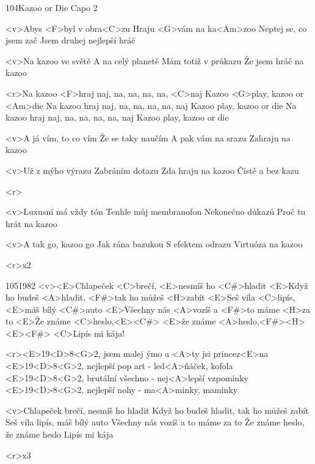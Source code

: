 \begin{song}{104}{Kazoo or Die}{}
Capo 2

<v>Abys <F>byl v obra<C>zu
Hraju <G>vám na ka<Am>zoo
Neptej se, co jsem zač
Jsem druhej nejlepší hráč

<v>Na kazoo ve světě
A na celý planetě
Mám totiž v průkazu
Že jsem hráč na kazoo

<r>Na kazoo <F>hraj naj, na, na, na, na, <C>naj
Kazoo <G>play, kazoo or <Am>die
Na kazoo hraj naj, na, na, na, na, naj
Kazoo play, kazoo or die
Na kazoo hraj naj, na, na, na, na, naj
Kazoo play, kazoo or die

<v>A já vím, to co vím
Že se taky naučím
A pak vám na srazu
Zahraju na kazoo

<v>Už z mýho výrazu
Zabráním dotazu
Zda hraju na kazoo
Čistě a bez kazu

<r>

<v>Luxusní má vždy tón
Tenhle můj membranofon
Nekonečno důkazů
Proč tu hrát na kazoo

<v>A tak go, kazoo go
Jak rána bazukou
S efektem odrazu
Virtuóza na kazoo

<r>x2
\end{song}
\begin{song}{105}{1982}{}
<v><E>Chlapeček <C>brečí, <E>nesmíš ho <C#>hladit
<E>Když ho budeš <A>hladit, <F#>tak ho můžeš <H>zabít
<E>Seš víla <C>lipís, <E>máš bílý <C#>auto
<E>Všechny nás <A>vozíš a <F#>to máme <H>za to
<E>Že známe <C>heslo,<E><C#>
<E>že známe <A>heslo,<F#><H><E><F#>
<C>Lipís mi kája!

<r><E>19<D>8<G>2, jsem malej ýmo a <A>ty jsi princez<E>na
<E>19<D>8<G>2, nejlepší pop art - led<A>ňáček, kofola
<E>19<D>8<G>2, brutální všechno - nej<A>lepší vzpomínky
<E>19<D>8<G>2, nejlepší nohy - ma<A>minky, maminky


<v>Chlapeček brečí, nesmíš ho hladit
Když ho budeš hladit, tak ho můžeš zabít
Seš víla lipís, máš bílý auto
Všechny nás vozíš a to máme za to
Že známe heslo, že známe heslo
Lipís mi kája

<r>x3
\end{song}

